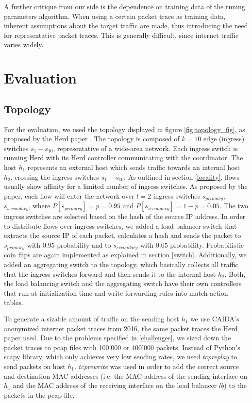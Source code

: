 \documentclass[11pt,oneside,a4paper]{article}
\begin{document}
A further critique from our side is the dependence on training data of the tuning parameters algorithm. When using a certain packet trace as training data, inherent assumptions about the target traffic are made, thus introducing the need for representative packet traces. This is generally difficult, since internet traffic varies widely.

\section{Evaluation}

\subsection{Topology} \label{topology}

For the evaluation, we used the topology displayed in figure \ref{fig:topology_fig}, as proposed by the Herd paper \cite{anon2019herd}. The topology is composed of $k=10$ edge (ingress) switches $s_1 - s_{10}$, representative of a wide-area network. Each ingress switch is running Herd with its Herd controller communicating with the coordinator. The host $h_1$ represents an external host which sends traffic towards an internal host $h_2$, crossing the ingress switches $s_1 - s_{10}$. As outlined in section \ref{locality}, flows usually show affinity for a limited number of ingress switches. As proposed by the paper, each flow will enter the network over $l = 2$ ingress switches $s_{primary}$, $s_{secondary}$, where $P[s_{primary}] = p = 0.95$ and $P[s_{secondary}] = 1-p = 0.05$. The two ingress switches are selected based on the hash of the source IP address. In order to distribute flows over ingress switches, we added a load balancer switch that extracts the source IP of each packet, calculates a hash and sends the packet to $s_{primary}$ with $0.95$ probability and to $s_{secondary}$ with $0.05$ probability. Probabilistic coin flips are again implemented as explained in section \ref{switch}. Additionally, we added an aggregating switch to the topology, which basically collects all traffic that the ingress switches forward and then sends it to the internal host $h_2$. Both, the load balancing switch and the aggregating switch have their own controllers that run at initialization time and write forwarding rules into match-action tables.


\noindent To generate a sizable amount of traffic on the sending host $h_1$ we use CAIDA's anonymized internet packet traces from 2016, the same packet traces the Herd paper used. Due to the problems specified in \ref{challenges}, we sized down the packet traces to pcap files with 100'000 or 400'000 packets. Instead of Python's scapy library, which only achieves very low sending rates, we used \textit{tcpreplay} to send packets on host $h_1$. \textit{tcprewrite} was used in order to add the correct source and destination MAC addresses (i.e. the MAC address of the sending interface on $h_1$ and the MAC address of the receiving interface on the load balancer $lb$) to the packets in the pcap file.
\end{document}

